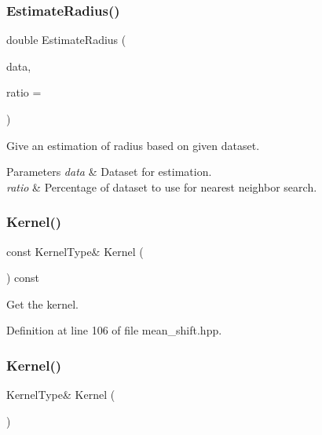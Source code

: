 \subsubsection{Estimate\+Radius()}
{\footnotesize\ttfamily double Estimate\+Radius (\begin{DoxyParamCaption}\item[{const Mat\+Type \&}]{data,  }\item[{const double}]{ratio = {} }\end{DoxyParamCaption})}



Give an estimation of radius based on given dataset. 


\begin{DoxyParams}{Parameters}
{\em data} & Dataset for estimation. \\
\hline
{\em ratio} & Percentage of dataset to use for nearest neighbor search. \\
\hline
\end{DoxyParams}
\mbox{\label{classmlpack_1_1meanshift_1_1MeanShift_a917492b75cc17298bc58c3d28e2944fb}} 
\subsubsection{Kernel()\hspace{0.1cm}{\footnotesize\ttfamily [1/2]}}
{\footnotesize\ttfamily const Kernel\+Type\& Kernel (\begin{DoxyParamCaption}{ }\end{DoxyParamCaption}) const\hspace{0.3cm}{\ttfamily [inline]}}



Get the kernel. 



Definition at line 106 of file mean\+\_\+shift.\+hpp.

\mbox{\label{classmlpack_1_1meanshift_1_1MeanShift_ab8d1bedeac8344d80e50d819790a117a}} 
\subsubsection{Kernel()\hspace{0.1cm}{\footnotesize\ttfamily [2/2]}}
{\footnotesize\ttfamily Kernel\+Type\& Kernel (\begin{DoxyParamCaption}{ }\end{DoxyParamCaption})\hspace{0.3cm}{\ttfamily [inline]}}



